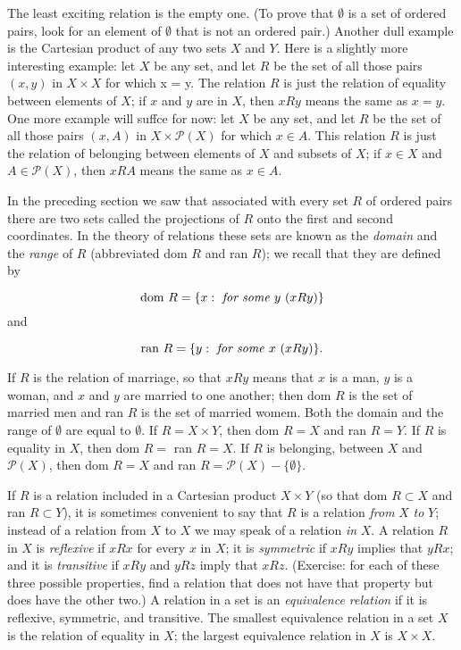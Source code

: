 The least exciting relation is the empty one. (To prove that $ \emptyset $ is a set of ordered pairs, look for an element of $ \emptyset $ that is not an ordered pair.) Another dull example is the Cartesian product of any two sets $X$ and $Y$. Here is a slightly more interesting example: let $X$ be any set, and let $R$ be the set of all those pairs $(x, y)$ in $X \times X$ for which x = y. The relation $R $ is just the relation of equality between elements of $X$; if $x$ and $y$ are in $X$, then $x R y$ means the same as $x = y$. One more example will suffce for now: let $X$ be any set, and let $R $ be the set of all those pairs $(x, A)$ in $X \times \mathcal{P} (X)$ for which $x \in A$. This relation $R $ is just the relation of belonging between elements of $X$ and subsets of $X$; if $x \in X$ and $A \in \mathcal{P}(X)$, then $x R A$ means the same as $x \in A$. 

In the preceding section we saw that associated with every set $R$ of ordered pairs there are two sets called the projections of $R$ onto the first and second coordinates. In the theory of relations these sets are known as the \textit{domain} and the \textit{range} of $R$  (abbreviated dom $R$ and ran $R$); we recall that they are defined by 

\begin{equation*}
\text{dom } R = \{ x: \text{ \textit{for some} } y\ (x R y) \}
\end{equation*}
and

\begin{equation*}
\text{ran } R = \{ y: \text{ \textit{for some} } x\ (x R y) \}.
\end{equation*}

If $R$ is the relation of marriage, so that $x R y$ means that $x$ is a man, $y$ is a woman, and $x$ and $y$ are married to one another; then dom $R$ is the set of married men and ran $R$ is the set of married womem. Both the domain and the range of $\emptyset$ are equal to $\emptyset$. If $R = X \times Y$, then dom $ R = X$ and ran $R = Y$. If $R$ is equality in $X$, then dom $R =$ ran $R = X$. If $R$ is belonging, between $X$ and $\mathcal{P}(X)$, then dom $R = X$ and ran $R = \mathcal{P}(X) - \{ \emptyset \}$. 

If $R$ is a relation included in a Cartesian product $X \times Y$ (so that dom $R \subset X$ and ran $R \subset Y$), it is sometimes convenient to say that $R$ is a relation \textit{from} $X$ \textit{to} $Y$; instead of a relation from $X$ to $X$ we may speak of a relation \textit{in} $X$. A relation $R$ in $X$ is \textit{reflexive} if $x R x$ for every $x$ in $X$; it is \textit{symmetric} if $ x R y$ implies that $y R x$; and it is \textit{transitive} if $x R y$ and $y R z$ imply that $x R z$. (Exercise: for each of these three possible properties, find a relation that does not have that property but does have the other two.) A relation in a set is an \textit{equivalence relation} if it is reflexive, symmetric, and transitive. The smallest equivalence relation in a set $X$ is the relation of equality in $X$; the largest equivalence relation in $X$ is $X \times X$. 

